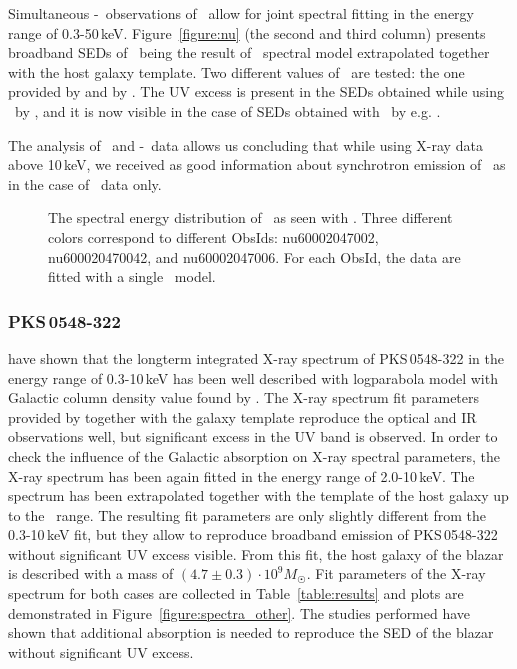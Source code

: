 Simultaneous \xrt-\nus\ observations of \one\ allow for joint spectral fitting in the energy range of 0.3-50\,keV. 
Figure~\ref{figure:nu} (the second and third column) presents broadband SEDs of \one\ being the result of \lp\ spectral model extrapolated together with the host galaxy template. 
Two different values of \nh\ are tested: the one provided by \cite{Kalberla2005} and by \cite{Willingale13}.
The UV excess is present in the SEDs obtained while using \nh\ by \cite{Kalberla2005}, and it is now visible in the case of SEDs obtained with \nh\ by e.g. \cite[][]{Willingale13}.

The analysis of \nus\ and \xrt-\nus\ data allows us concluding that while using  X-ray data above  10\,keV, we received as good information about synchrotron emission of \one\ as in the case of \xrt\ data only. 




\begin{figure}
 \caption[]{The spectral energy distribution of \one\ as seen with \nus. Three different colors correspond to different ObsIds: nu60002047002, nu600020470042, and nu60002047006. For each ObsId, the data are fitted with a single \po\ model.  }
 \label{figure:nus_spec}
\end{figure}

















 

\subsubsection*{PKS\,0548-322}
\cite{Wierzcholska2016}  have shown that the longterm integrated X-ray spectrum of PKS\,0548-322 in the energy range of 0.3-10\,keV has been well described with logparabola model with Galactic column density value found by \cite{Kalberla2005}. 
The X-ray spectrum fit parameters provided by \cite{Wierzcholska2016} together with the galaxy template reproduce the optical and IR observations well, but significant excess in the UV band is observed.
In order to check the influence of the Galactic absorption on X-ray spectral parameters, the X-ray spectrum has been again fitted in the energy range of 2.0-10\,keV. 
The spectrum has been extrapolated together with the template of the host galaxy up to the \itu\ range. The resulting fit parameters are only slightly different from the 0.3-10\,keV fit, but they allow to reproduce broadband emission of    PKS\,0548-322 without significant UV excess visible. 
From this fit, the host galaxy of the blazar is described with a mass of $(4.7\pm0.3) \cdot 10^{9} M_{\astrosun}$. 
Fit parameters of the X-ray spectrum for both cases are collected in Table~\ref{table:results} and plots are demonstrated in Figure~\ref{figure:spectra_other}.
The studies performed have shown that additional absorption is needed to reproduce the SED of the blazar without significant UV excess. 


